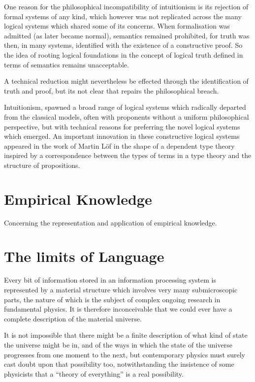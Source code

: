 \documentclass[10pt,titlepage]{book}
\begin{document}
One reason for the philosophical incompatibility of intuitionism is its rejection of formal systems of any kind, which however was not replicated across the many logical systems which shared some of its concerns.
When formalisation was admitted (as later became normal), semantics remained prohibited, for truth was then, in many systems, identified with the existence of a constructive proof.
So the idea of rooting logical foundations in the concept of logical truth defined in terms of semantics remains unacceptable.

A technical reduction might nevertheless be effected through the identification of truth and proof, but its not clear that repairs the philosophical breach.

Intuitionism, spawned a broad range of logical systems which radically departed from the classical models, often with proponents without a uniform philosophical perspective, but with technical reasons for preferring the novel logical systems which emerged.
An important innovation in these constructive logical systems appeared in the work of Martin L\"of in the shape of a dependent type theory inspired by a correspondence between the types of terms in a type theory and the structure of propositions.

\chapter{Empirical Knowledge}

Concerning the representation and application of empirical knowledge.

\chapter{The limits of Language}

Every bit of information stored in an information processing system is represented by a material structure which involves very many submicroscopic parts, the nature of which is the subject of complex ongoing research in fundamental physics.
It is therefore inconceivable that we could ever have a complete description of the material universe.

It is not impossible that there might be a finite description of what kind of state the universe might be in, and of the ways in which the state of the universe progresses from one moment to the next, but contemporary physics must surely cast doubt upon that possibility too, notwithstanding the insistence of some physicists that a ``theory of everything'' is a real possibility.
\end{document}

